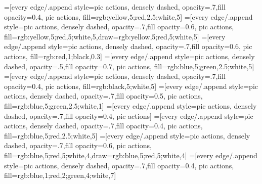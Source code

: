 \usetikzlibrary{quotes,arrows.meta}
\usetikzlibrary{positioning}

\newcommand*{\SecondLastLayerOriginX}{No value}
\def\edgecolor{rgb:blue,4;red,1;green,4;black,3}
\newcommand{\midarrow}{\tikz \draw[-Stealth,line width =0.8mm,draw=\edgecolor] (-0.3,0) -- ++(0.3,0);}

  =[every edge/.append style={pic actions, densely dashed, opacity=.7},fill opacity=0.4, pic actions, fill={rgb:yellow,5;red,2.5;white,5}]
  =[every edge/.append style={pic actions, densely dashed, opacity=.7},fill opacity=0.6, pic actions, fill={rgb:yellow,5;red,5;white,5},draw={rgb:yellow,5;red,5;white,5}]
  =[every edge/.append style={pic actions, densely dashed, opacity=.7},fill opacity=0.6, pic actions, fill={rgb:red,1;black,0.3}]%
=[every edge/.append style={pic actions, densely dashed, opacity=.5},fill opacity=0.7, pic actions, fill={rgb:blue,5;green,2.5;white,5}]
=[every edge/.append style={pic actions, densely dashed, opacity=.7},fill opacity=0.4, pic actions, fill={rgb:black,5;white,5}]
=[every edge/.append style={pic actions, densely dashed, opacity=.7},fill opacity=0.5, pic actions, fill={rgb:blue,5;green,2.5;white,1}]
 =[every edge/.append style={pic actions, densely dashed, opacity=.7},fill opacity=0.4, pic actions]
  =[every edge/.append style={pic actions, densely dashed, opacity=.7},fill opacity=0.4, pic actions, fill={rgb:blue,5;red,2.5;white,5}]
  =[every edge/.append style={pic actions, densely dashed, opacity=.7},fill opacity=0.6, pic actions, fill={rgb:blue,5;red,5;white,4},draw={rgb:blue,5;red,5;white,4}]
  =[every edge/.append style={pic actions, densely dashed, opacity=.7},fill opacity=0.4, pic actions, fill={rgb:blue,1;red,2;green,4;white,7}]

\usepackage{ConvReluPool}
\usepackage{Gray}
\usepackage{ConvRelu}
\usepackage{Conv}
\usepackage{Deconv}
\usepackage{UpConvRelu}
\usepackage{Up}
\usepackage{Multiply}
\usepackage{Sum}
\usepackage{SigmaSum}
\usepackage{FullyConnected}
\usepackage{FullyConnectedRelu}
\usepackage{DomainTransform}
\usepackage{GenericSequentialLayer}

